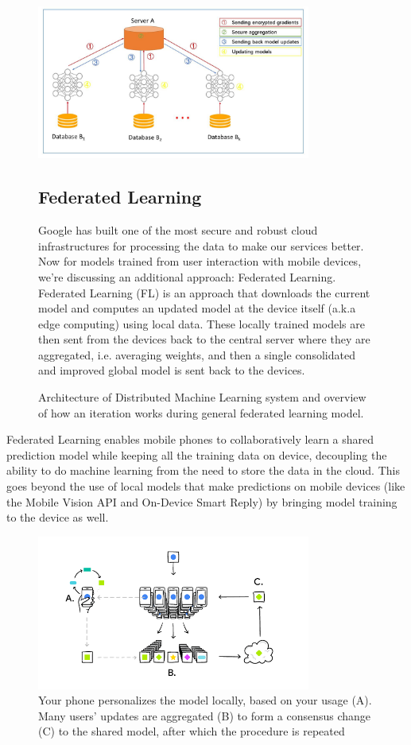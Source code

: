 \documentclass[conference]{IEEEtran}
\begin{document}
\begin{figure}
\includegraphics[width=90mm,scale=0.7]{fig.jpg}
\caption{ Architecture of Distributed Machine Learning system and overview of how an iteration  works during general federated learning model.}

\vspace{\baselineskip}

\subsection{Federated Learning}\label{AA}
Google has built one of the most secure and robust cloud infrastructures for processing the data to make our services better. Now for models trained from user interaction with mobile devices, we're discussing an additional approach: Federated Learning.
Federated Learning (FL) is an approach that downloads the current model and computes an updated model at the device itself (a.k.a edge computing) using local data. These locally trained models are then sent from the devices back to the central server where they are aggregated, i.e. averaging weights, and then a single consolidated and improved global model is sent back to the devices.
\end{figure}
Federated Learning enables mobile phones to collaboratively learn a shared prediction model while keeping all the training data on device, decoupling the ability to do machine learning from the need to store the data in the cloud. This goes beyond the use of local models that make predictions on mobile devices (like the Mobile Vision API and On-Device Smart Reply) by bringing model training to the device as well.

\begin{figure} \includegraphics[width=90mm,scale=0.7]{2.png}\caption{Your phone personalizes the model locally, based on your usage (A). Many users' updates are aggregated (B) to form a consensus change (C) to the shared model, after which the procedure is repeated}
\end{figure}
\end{document}
